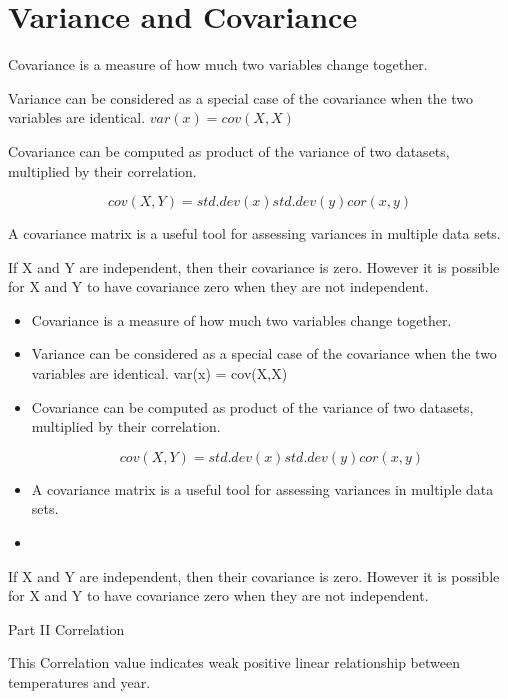\documentclass[]{report}
\begin{document}
\section{Variance and Covariance}
Covariance is a measure of how much two variables change together. 

Variance can be considered as a special case of the covariance when the two variables are identical.
$var(x) = cov(X,X)$

Covariance can be computed as product of the variance of two datasets, multiplied by their correlation.

\[
cov(X,Y) = std.dev (x) std.dev(y) cor(x,y)
\]

A covariance matrix is a useful tool for assessing variances in multiple data sets.


If X and Y are independent, then their covariance is zero. However it is possible for X and Y to have covariance zero when they are not independent.


\begin{itemize}
	\item Covariance is a measure of how much two variables change together. 
	
	\item	Variance can be considered as a special case of the covariance when the two variables are identical. 
	var(x) = cov(X,X)
	
	\item Covariance can be computed as product of the variance of two datasets, multiplied by their correlation.
	
	\[cov(X,Y) = std.dev (x) std.dev(y) cor(x,y)\]
	
	
	\item	A covariance matrix is a useful tool for assessing variances in multiple data sets.
	\item 
\end{itemize}




If X and Y are independent, then their covariance is zero. However it is possible for X and Y to have covariance zero when they are not independent.








Part II 	Correlation


This Correlation value indicates weak positive linear relationship between temperatures and year.
\end{document}
